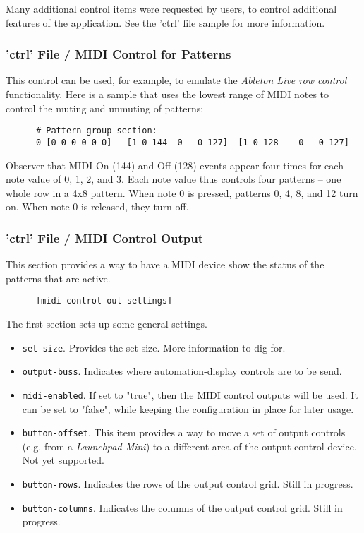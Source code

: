   Many additional control items were requested by users, to control
   additional features of the application.
   See the 'ctrl' file sample for more information.

\subsubsection{'ctrl' File / MIDI Control for Patterns}
\label{subsubsec:configuration_ctrl_midi_control_out}

   This control can be used, for example, to emulate the \textsl{Ableton Live
   row control} functionality.  Here is a sample that uses the lowest range of
   MIDI notes to control the muting and unmuting of patterns:

   \begin{verbatim}
      # Pattern-group section:
      0 [0 0 0 0 0 0]   [1 0 144  0   0 127]  [1 0 128    0   0 127]
   \end{verbatim}

   Observer that MIDI On (144) and Off (128) events appear four times for
   each note value of 0, 1, 2, and 3.  Each note value thus controls four
   patterns -- one whole row in a 4x8 pattern.  When note 0 is pressed,
   patterns 0, 4, 8, and 12 turn on.  When note 0 is released, they turn off.

\subsubsection{'ctrl' File / MIDI Control Output}
\label{subsubsec:configuration_ctrl_midi_control_out}

   This section provides a way to have a MIDI device show the status
   of the patterns that are active.

   \begin{verbatim}
      [midi-control-out-settings]
   \end{verbatim}

   The first section sets up some general settings.

   \begin{itemize}
      \item \texttt{set-size}.
         Provides the set size.  More information to dig for.
      \item \texttt{output-buss}.
         Indicates where automation-display controls are to be send.
      \item \texttt{midi-enabled}.
         If set to "true", then the MIDI control outputs will be used.
         It can be set to "false", while keeping the configuration in place
         for later usage.
      \item \texttt{button-offset}.
         This item provides a way to move a set of output controls (e.g. from a
         \textsl{Launchpad Mini}) to a different area of the output control
         device.  Not yet supported.
      \item \texttt{button-rows}.
         Indicates the rows of the output control grid.
         Still in progress.
      \item \texttt{button-columns}.
         Indicates the columns of the output control grid.
         Still in progress.
   \end{itemize}

